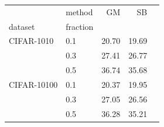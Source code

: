 \begin{tabular}{llrrr}
\toprule
         & method &  GM &    SB \\
dataset & fraction &    &       \\
\midrule
CIFAR-1010 & 0.1 & 20.70 & 19.69 \\
         & 0.3 & 27.41 & 26.77 \\
         & 0.5 & 36.74 & 35.68 \\
CIFAR-10100 & 0.1 & 20.37 & 19.95 \\
         & 0.3 & 27.05 & 26.56 \\
         & 0.5 & 36.28 & 35.21 \\
\bottomrule
\end{tabular}
